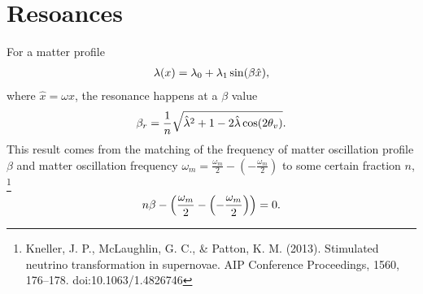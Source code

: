 \documentclass[letterpaper,12pt,english]{sphinxmanual}
\begin{document}
\section{Resoances}
\label{matter-driven:resoances}
For a matter profile
\begin{gather}
\begin{split}\lambda (x) = \lambda_0 + \lambda_1 \sin ( \beta \hat x ),\end{split}\notag
\end{gather}
where \(\hat x = \omega x\), the resonance happens at a \(\beta\) value
\begin{gather}
\begin{split}\beta_r = \frac{1}{n} \sqrt{ \hat \lambda ^2 +1 - 2\hat\lambda \cos (2\theta_v) }.\end{split}\notag
\end{gather}
This result comes from the matching of the frequency of matter oscillation profile \(\beta\) and matter oscillation frequency \(\omega_m = \frac{\omega_m}{2} - \left( -\frac{\omega_m}{2} \right)\) to some certain fraction \(n\), \footnote[1]{
Kneller, J. P., McLaughlin, G. C., \& Patton, K. M. (2013). Stimulated neutrino transformation in supernovae. AIP Conference Proceedings, 1560, 176–178. doi:10.1063/1.4826746
}
\begin{gather}
\begin{split}n \beta - \left( \frac{\omega_m}{2} - \left( -\frac{\omega_m}{2} \right) \right) = 0.\end{split}\notag
\end{gather}
\end{document}
